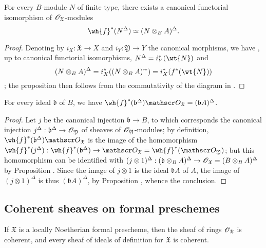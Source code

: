\begin{proposition}[10.10.8]
\label{1.10.10.8}
For every $B$-module $N$ of finite type, there exists a canonical functorial isomorphism of $\mathscr{O}_\mathfrak{X}$-modules
\[
  \wh{f}^*(N^\Delta)\isoto(N\otimes_B A)^\Delta.
\]
\end{proposition}

\begin{proof}
\label{proof-1.10.10.8}
Denoting by $i_X:\mathfrak{X}\to X$ and $i_Y:\mathfrak{Y}\to Y$ the canonical morphisms, we have , up to canonical functorial isomorphisms, $N^\Delta=i_Y^*(\wt{N})$ and
\[
  (N\otimes_B A)^\Delta=i_X^*((N\otimes_B A)^\sim)=i_X^*(f^*(\wt{N}))
\]
; the proposition then follows from the commutativity of the diagram in .
\end{proof}

\begin{corollary}
\label{1.10.10.9}
For every ideal $\mathfrak{b}$ of $B$, we have $\wh{f}^*(\mathfrak{b}^\Delta)\sh{O}_\mathfrak{X}=(\mathfrak{b}A)^\Delta$.
\end{corollary}

\begin{proof}
\label{proof-1.10.10.9}
Let $j$ be the canonical injection $\mathfrak{b}\to B$, to which corresponds the canonical injection $j^\Delta:\mathfrak{b}^\Delta\to\sh{O}_\mathfrak{Y}$ of sheaves of $\mathscr{O}_\mathfrak{Y}$-modules; by definition, $\wh{f}^*(\mathfrak{b}^\Delta)\sh{O}_\mathfrak{X}$ is the image of the homomorphism $\wh{f}^*(j^\Delta):\wh{f}^*(\mathfrak{b}^\Delta)\to\sh{O}_\mathfrak{X}=\wh{f}^*(\sh{O}_\mathfrak{Y})$; but this homomorphism can be identified with $(j\otimes 1)^\Delta:(\mathfrak{b}\otimes_B A)^\Delta\to\sh{O}_\mathfrak{X}=(B\otimes_B A)^\Delta$ by Proposition .
Since the image of $j\otimes 1$ is the ideal $\mathfrak{b}A$ of $A$, the image of $(j\otimes 1)^\Delta$ is thus $(\mathfrak{b}A)^\Delta$, by Proposition , whence the conclusion.
\end{proof}

\subsection{Coherent sheaves on formal preschemes}
\label{subsection:1.10.11}

\begin{proposition}[10.11.1]
\label{1.10.11.1}
If $\mathfrak{X}$ is a locally Noetherian formal prescheme, then the sheaf of rings $\mathscr{O}_\mathfrak{X}$ is coherent, and every sheaf of ideals of definition for $\mathfrak{X}$ is coherent.
\end{proposition}


